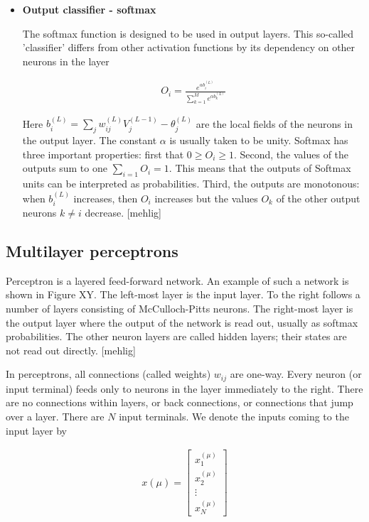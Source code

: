 \begin{itemize}
\item \textbf{Output classifier - softmax}

The softmax function is designed to be used in output layers. This so-called 'classifier' differs from other activation functions by its dependency on other neurons in the layer

\begin{gather}
	O_{i} = \frac{e^{\alpha b_i^{(L)}}}{\sum_{k=1}^{M} e^{\alpha b_k^{(L)}}}
\end{gather}

Here $ b_{i}^{(L)} = \sum_{j}w_{ij}^{(L)} V_{j}^{(L-1)} - \theta _{j}^{(L)} $  are the local fields of the neurons in the output layer. The constant $\alpha$ is usually taken to be unity. Softmax has three important properties: first that 
$ 0 \geq O_i \geq 1 $. Second, the values of the outputs sum to one $ \sum_{i=1} O_i = 1 $. This means that the outputs of Softmax units can be interpreted as probabilities. Third, the outputs are monotonous: when $ b_i^{(L)} $ increases, then $ O_i $ increases but the values $ O_k $ of the other output neurons $ k \neq i $ decrease. [mehlig]

\end{itemize}

\subsection{Multilayer perceptrons}

Perceptron is a layered feed-forward network. An example of such a network is shown in Figure XY. The left-most layer is the input layer. To the right follows a number of layers consisting of McCulloch-Pitts neurons. The right-most layer is the output layer where the output of the network is read out, usually as softmax probabilities. The other neuron layers are called hidden layers; their states are not read out directly. [mehlig]

In perceptrons, all connections (called weights) $ w_{ij} $ are one-way. Every neuron (or input terminal) feeds only to neurons in the layer immediately to the right. There are no connections within layers, or back connections, or connections that jump over a layer. There are $ N $ input terminals. We denote the inputs coming to the input layer by

\begin{gather}
	x(\mu)= 
	\begin{bmatrix}
	x_{1}^{(\mu)} \\
	x_{2}^{(\mu)} \\
	\vdots \\
	x_{N}^{(\mu)} 
	\end{bmatrix}
\end{gather}

